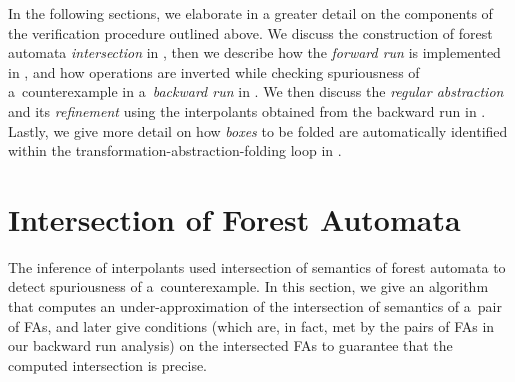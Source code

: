 
In the following sections, we elaborate in a greater detail on the components
of the verification procedure outlined above. 
We discuss the construction of forest automata \emph{intersection} in ,  
then we describe how the \emph{forward run} is implemented
in , 
and how operations are
inverted while checking spuriousness of a~counterexample in a~\emph{backward
run} in .
We then discuss the \emph{regular abstraction} and its
\emph{refinement} using the interpolants obtained from the backward run
in .
Lastly, we give more detail on how \emph{boxes} to be folded are automatically identified within the
transformation-abstraction-folding loop in .

\section{Intersection of Forest Automata}
\label{sec:intersection}

The inference of interpolants used intersection of semantics of forest automata to
detect spuriousness of a~counterexample.
In this section, we give an algorithm that computes an under-approximation of
the intersection of semantics of a~pair of FAs, and later give conditions
(which are, in fact, met by the pairs of FAs in our backward run analysis) on
the intersected FAs to guarantee that the computed intersection is precise.

